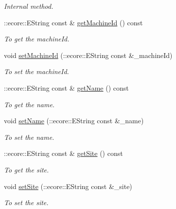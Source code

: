 \begin{DoxyCompactItemize}
\begin{DoxyCompactList}\small\item\em Internal method. \item\end{DoxyCompactList}\item 
::ecore::EString const \& \hyperlink{classUMS__Data_1_1Machine_a7ec1ee894fbc0e9741bd6abc120b7e14}{getMachineId} () const 
\begin{DoxyCompactList}\small\item\em To get the machineId. \item\end{DoxyCompactList}\item 
void \hyperlink{classUMS__Data_1_1Machine_ad417f2b1d2bd78ae013779fa35ab1b47}{setMachineId} (::ecore::EString const \&\_\-machineId)
\begin{DoxyCompactList}\small\item\em To set the machineId. \item\end{DoxyCompactList}\item 
::ecore::EString const \& \hyperlink{classUMS__Data_1_1Machine_a54f59817804b21d12555b486c220f9c2}{getName} () const 
\begin{DoxyCompactList}\small\item\em To get the name. \item\end{DoxyCompactList}\item 
void \hyperlink{classUMS__Data_1_1Machine_a8ee47377954ded6d6d730c2790fa7992}{setName} (::ecore::EString const \&\_\-name)
\begin{DoxyCompactList}\small\item\em To set the name. \item\end{DoxyCompactList}\item 
::ecore::EString const \& \hyperlink{classUMS__Data_1_1Machine_ab472067f66fc88904ac41efd682f8563}{getSite} () const 
\begin{DoxyCompactList}\small\item\em To get the site. \item\end{DoxyCompactList}\item 
void \hyperlink{classUMS__Data_1_1Machine_a6c208a1fcb553e6b7c08a6a6d5df0dc6}{setSite} (::ecore::EString const \&\_\-site)
\begin{DoxyCompactList}\small\item\em To set the site. \item\end{DoxyCompactList}\item 

\end{DoxyCompactItemize}

